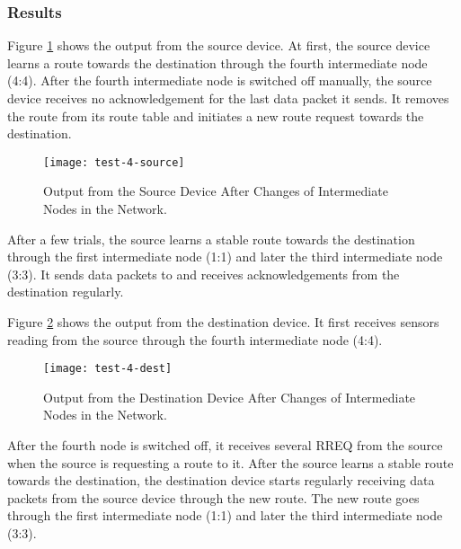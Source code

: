 \subsubsection{Results}

Figure \ref{fig:test-4-source} shows the output from the source device.
At first, the source device learns a route towards the destination through the fourth intermediate node (4:4).
After the fourth intermediate node is switched off manually, the source device receives no acknowledgement for the last data packet it sends.
It removes the route from its route table and initiates a new route request towards the destination.

\begin{figure}
\centering
\texttt{[image: test-4-source]}
\caption{Output from the Source Device After Changes of Intermediate Nodes in the Network.}
\label{fig:test-4-source}
\end{figure}


After a few trials, the source learns a stable route towards the destination through the first intermediate node (1:1) and later the third intermediate node (3:3).
It sends data packets to and receives acknowledgements from the destination regularly.

Figure \ref{fig:test-4-dest} shows the output from the destination device.
It first receives sensors reading from the source through the fourth intermediate node (4:4). 

\begin{figure}
\centering
\texttt{[image: test-4-dest]}
\caption{Output from the Destination Device After Changes of Intermediate Nodes in the Network.}
\label{fig:test-4-dest}
\end{figure}

After the fourth node is switched off, it receives several RREQ from the source when the source is requesting a route to it.
After the source learns a stable route towards the destination, the destination device starts regularly receiving data packets from the source device through the new route.
The new route goes through the first intermediate node (1:1) and later the third intermediate node (3:3).

